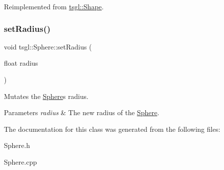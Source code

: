 Reimplemented from \hyperlink{classtsgl_1_1_shape_ad7e554b5d4cea111ec518548b9f21388}{tsgl\+::\+Shape}.

\mbox{\label{classtsgl_1_1_sphere_a7d1f92b4c10a165b909cb6edb12288d5}} 
\subsubsection{\texorpdfstring{set\+Radius()}{setRadius()}}
{\footnotesize\ttfamily void tsgl\+::\+Sphere\+::set\+Radius (\begin{DoxyParamCaption}\item[{float}]{radius }\end{DoxyParamCaption})\hspace{0.3cm}{\ttfamily [virtual]}}



Mutates the \hyperlink{classtsgl_1_1_sphere}{Sphere}\textquotesingle{}s radius. 


\begin{DoxyParams}{Parameters}
{\em radius} & The new radius of the \hyperlink{classtsgl_1_1_sphere}{Sphere}. \\
\hline
\end{DoxyParams}


The documentation for this class was generated from the following files\+:\begin{DoxyCompactItemize}
\item 
Sphere.\+h\item 
Sphere.\+cpp\end{DoxyCompactItemize}
